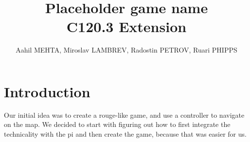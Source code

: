 \documentclass[11pt]{article}
\begin{document}
\title{Placeholder game name\\
\large C120.3 Extension}

\author{Aahil MEHTA, Miroslav LAMBREV, Radostin PETROV, Ruari PHIPPS}

\maketitle

\section{Introduction}

Our initial idea was to create a rouge-like game, and use a controller to navigate on the map. We decided to start with figuring out how to first integrate the technicality with the pi and then create the game, because that was easier for us.
\end{document}

